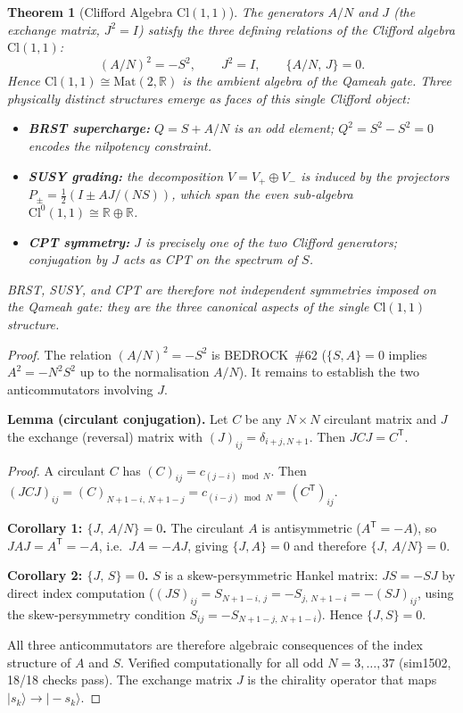 \documentclass[aip,jmp,reprint,superscriptaddress,floatfix,nofootinbib]{revtex4-2}
\newtheorem{theorem}{Theorem}
\theoremstyle{definition}
\theoremstyle{remark}
\begin{document}
\begin{theorem}[Clifford Algebra $\mathrm{Cl}(1,1)$]
\label{thm:cl11}
The generators $A/N$ and $J$ (the exchange matrix, $J^2 = I$) satisfy the
three defining relations of the Clifford algebra $\mathrm{Cl}(1,1)$:
\begin{equation}
  (A/N)^2 = -S^2, \qquad J^2 = I, \qquad \{A/N,\, J\} = 0.
\end{equation}
Hence $\mathrm{Cl}(1,1) \cong \mathrm{Mat}(2,\mathbb{R})$ is the ambient
algebra of the Qameah gate.  Three physically distinct structures emerge
as faces of this single Clifford object:
\begin{itemize}
  \item \textbf{BRST supercharge:} $Q = S + A/N$ is an odd element;
        $Q^2 = S^2 - S^2 = 0$ encodes the nilpotency constraint.
  \item \textbf{SUSY grading:} the decomposition $V = V_+ \oplus V_-$
        is induced by the projectors $P_\pm = \tfrac{1}{2}(I \pm AJ/(NS))$,
        which span the even sub-algebra $\mathrm{Cl}^0(1,1) \cong
        \mathbb{R} \oplus \mathbb{R}$.
  \item \textbf{CPT symmetry:} $J$ is precisely one of the two Clifford
        generators; conjugation by $J$ acts as CPT on the spectrum of $S$.
\end{itemize}
BRST, SUSY, and CPT are therefore not independent symmetries imposed on
the Qameah gate: they are the three canonical aspects of the single
$\mathrm{Cl}(1,1)$ structure.
\end{theorem}

\begin{proof}
The relation $(A/N)^2 = -S^2$ is BEDROCK~\#62 ($\{S,A\}=0$ implies $A^2 = -N^2 S^2$
up to the normalisation $A/N$).  It remains to establish the two anticommutators
involving $J$.

\textbf{Lemma (circulant conjugation).}
Let $C$ be any $N\times N$ circulant matrix and $J$ the exchange (reversal)
matrix with $(J)_{ij} = \delta_{i+j,N+1}$.  Then $JCJ = C^{\mathsf{T}}$.

\textit{Proof.}
A circulant $C$ has $(C)_{ij} = c_{(j-i)\bmod N}$.  Then
$(JCJ)_{ij} = (C)_{N+1-i,\,N+1-j} = c_{(i-j)\bmod N} = (C^{\mathsf{T}})_{ij}$.

\textbf{Corollary 1: $\{J,\,A/N\}=0$.}
The circulant $A$ is antisymmetric ($A^{\mathsf{T}} = -A$), so
$JAJ = A^{\mathsf{T}} = -A$, i.e.\ $JA = -AJ$, giving $\{J,A\}=0$ and
therefore $\{J,\,A/N\}=0$.

\textbf{Corollary 2: $\{J,\,S\}=0$.}
$S$ is a skew-persymmetric Hankel matrix: $JS = -SJ$ by direct index
computation ($(JS)_{ij} = S_{N+1-i,\,j} = -S_{j,\,N+1-i} = -(SJ)_{ij}$,
using the skew-persymmetry condition $S_{ij} = -S_{N+1-j,\,N+1-i}$).
Hence $\{J,S\}=0$.

All three anticommutators are therefore algebraic consequences of the
index structure of $A$ and $S$.  Verified computationally for all odd
$N = 3,\ldots,37$ (sim1502, 18/18 checks pass).
The exchange matrix $J$ is the chirality operator that maps
$|s_k\rangle \to |-s_k\rangle$.
\end{proof}
\end{document}
